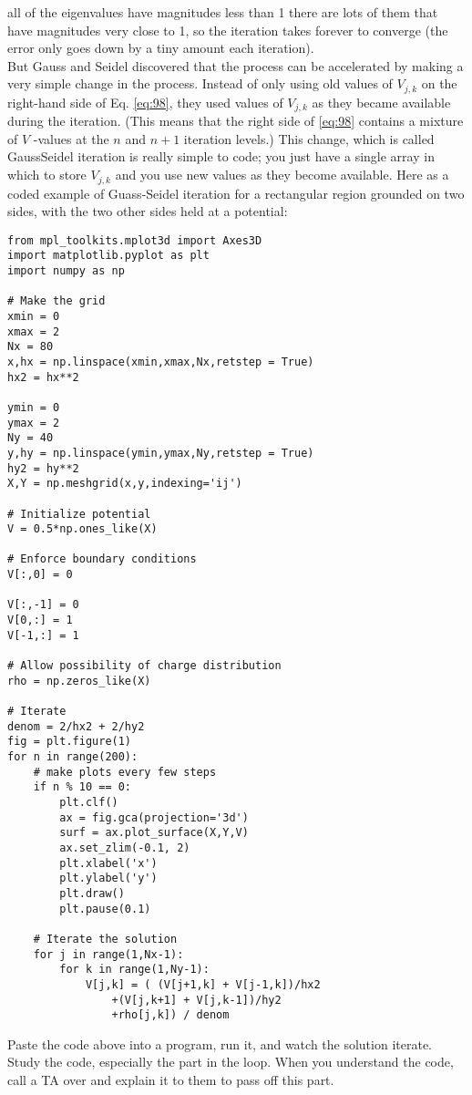 all of the eigenvalues have magnitudes less than 1 there are lots of them that have
magnitudes very close to 1, so the iteration takes forever to converge (the error
only goes down by a tiny amount each iteration). \\ 
But Gauss and Seidel discovered that the process can be accelerated by making
a very simple change in the process. Instead of only using old values of $V_{j,k}$ on
the right-hand side of Eq. \ref{eq:98}, they used values of $V_{j,k}$ as they became available
during the iteration. (This means that the right side of \ref{eq:98} contains a mixture
of $V$ -values at the $n$ and $n +1$ iteration levels.) This change, which is called GaussSeidel iteration is really simple to code; you just have a single array in which to
store $V_{j,k}$ and you use new values as they become available. Here as a coded
example of Guass-Seidel iteration for a rectangular region grounded on two sides,
with the two other sides held at a potential:
\begin{lstlisting}
from mpl_toolkits.mplot3d import Axes3D
import matplotlib.pyplot as plt
import numpy as np

# Make the grid
xmin = 0
xmax = 2
Nx = 80
x,hx = np.linspace(xmin,xmax,Nx,retstep = True)
hx2 = hx**2

ymin = 0
ymax = 2
Ny = 40
y,hy = np.linspace(ymin,ymax,Ny,retstep = True)
hy2 = hy**2
X,Y = np.meshgrid(x,y,indexing='ij')

# Initialize potential
V = 0.5*np.ones_like(X)

# Enforce boundary conditions
V[:,0] = 0

V[:,-1] = 0
V[0,:] = 1
V[-1,:] = 1

# Allow possibility of charge distribution
rho = np.zeros_like(X)

# Iterate
denom = 2/hx2 + 2/hy2
fig = plt.figure(1)
for n in range(200):
	# make plots every few steps
	if n % 10 == 0:
		plt.clf()
		ax = fig.gca(projection='3d')
		surf = ax.plot_surface(X,Y,V)
		ax.set_zlim(-0.1, 2)
		plt.xlabel('x')
		plt.ylabel('y')
		plt.draw()
		plt.pause(0.1)

	# Iterate the solution
	for j in range(1,Nx-1):
		for k in range(1,Ny-1):
			V[j,k] = ( (V[j+1,k] + V[j-1,k])/hx2
				+(V[j,k+1] + V[j,k-1])/hy2
				+rho[j,k]) / denom
\end{lstlisting}
\begin{problem}\label{P9.2}  Paste the code above into a program, run it, and watch the solution iterate.
Study the code, especially the part in the loop. When you understand the
code, call a TA over and explain it to them to pass off this part.
\end{problem}

